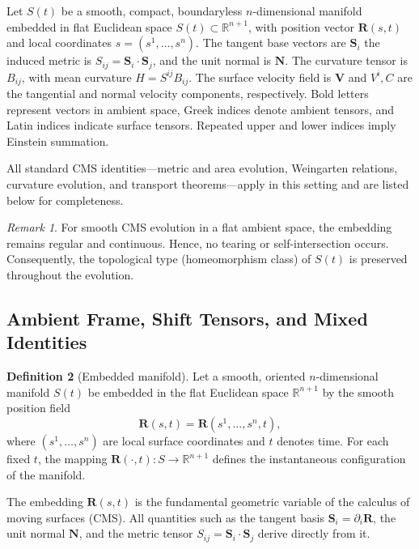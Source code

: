 \documentclass[11pt]{article}
\newcommand{\MeanCurv}{H}
\theoremstyle{definition}
\newtheorem{definition}{Definition}[section]
\theoremstyle{plain}
\theoremstyle{remark}
\newtheorem{remark}[definition]{Remark}
\begin{document}
Let $S(t)$ be a smooth, compact, boundaryless $n$-dimensional manifold embedded in flat Euclidean space $S(t)\subset\mathbb{R}^{n+1}$, 
with position vector $\mathbf{R}(s,t)$ and local coordinates $s=(s^1,\dots,s^n)$. 
The tangent base vectors are $\mathbf{S}_i$  
the induced metric is $S_{ij} = \mathbf{S}_i \!\cdot\! \mathbf{S}_j$, 
and the unit normal is $\mathbf{N}$. 
The curvature tensor is $B_{ij}$, with mean curvature $\MeanCurv = S^{ij} B_{ij}$. 
The surface velocity field is
$\mathbf{V}$ and $V^i, C$ are the tangential and normal velocity components, respectively. Bold letters represent vectors in ambient space, Greek indices denote ambient tensors, and Latin indices indicate surface tensors. Repeated upper and lower indices imply Einstein summation.

All standard CMS identities—metric and area evolution, Weingarten relations, curvature evolution, and transport theorems—apply in this setting and are listed below for completeness.  

\begin{remark}
For smooth CMS evolution in a flat ambient space, the embedding remains regular and continuous. 
Hence, no tearing or self-intersection occurs. 
Consequently, the topological type (homeomorphism class) of $S(t)$ is preserved throughout the evolution.
\end{remark}

\subsection{Ambient Frame, Shift Tensors, and Mixed Identities}

\begin{definition}[Embedded manifold]\label{def:embedded-manifold}
Let a smooth, oriented $n$-dimensional manifold $S(t)$ be embedded in the flat Euclidean space $\mathbb{R}^{n+1}$ by the smooth position field
\begin{equation}
\mathbf{R}(s,t)=\mathbf{R}(s^{1},\ldots,s^{n},t),
\end{equation}
where $(s^{1},\ldots,s^{n})$ are local surface coordinates and $t$ denotes time.
For each fixed $t$, the mapping $\mathbf{R}(\cdot,t):S\to\mathbb{R}^{n+1}$ defines the instantaneous configuration of the manifold.
\end{definition}

\noindent
The embedding $\mathbf{R}(s,t)$ is the fundamental geometric variable of the calculus of moving surfaces (CMS).  
All quantities such as the tangent basis $\mathbf{S}_i=\partial_i\mathbf{R}$, the unit normal $\mathbf{N}$, and the metric tensor $S_{ij}=\mathbf{S}_i\!\cdot\!\mathbf{S}_j$ derive directly from it.
\end{document}
